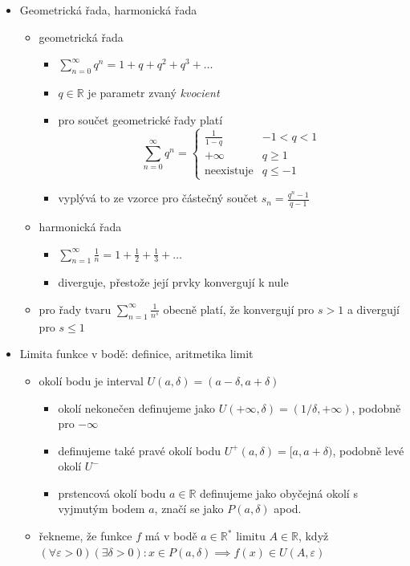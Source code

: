 \begin{itemize}
\begin{itemize}
\item pokud $\lim s_n$ neexistuje nebo je nevlastní, je daná řada \textit{divergentní}
\end{itemize}
\item Geometrická řada, harmonická řada
\begin{itemize}
\item geometrická řada
\begin{itemize}
\item $\sum_{n=0}^\infty q^n=1+q+q^2+q^3+\dots$
\item $q\in\mathbb R$ je parametr zvaný \textit{kvocient}
\item pro součet geometrické řady platí \[\sum_{n=0}^\infty q^n=\begin{cases}\frac1{1-q} &-1\lt q\lt1\\ +\infty &q\geq 1\\\text{neexistuje}&q\leq -1\end{cases}\]
\item vyplývá to ze vzorce pro částečný součet $s_n=\frac{q^n-1}{q-1}$
\end{itemize}
\item harmonická řada
\begin{itemize}
\item $\sum_{n=1}^\infty\frac 1n=1+\frac12+\frac13+\dots$
\item diverguje, přestože její prvky konvergují k nule
\end{itemize}
\item pro řady tvaru $\sum_{n=1}^\infty\frac1{n^s}$ obecně platí, že konvergují pro $s\gt 1$ a divergují pro $s\leq 1$
\end{itemize}
\item Limita funkce v bodě: definice, aritmetika limit
\begin{itemize}
\item okolí bodu je interval $U(a,\delta)=(a-\delta,a+\delta)$
\begin{itemize}
\item okolí nekonečen definujeme jako $U(+\infty,\delta)=(1/\delta,+\infty)$, podobně pro $-\infty$
\item definujeme také pravé okolí bodu $U^+(a,\delta)=[a,a+\delta)$, podobně levé okolí $U^-$
\item prstencová okolí bodu $a\in\mathbb R$ definujeme jako obyčejná okolí s vyjmutým bodem $a$, značí se jako $P(a,\delta)$ apod.
\end{itemize}
\item řekneme, že funkce $f$ má v bodě $a\in\mathbb R^*$ limitu $A\in\mathbb R$, když $(\forall\varepsilon\gt 0)(\exists\delta\gt 0):x\in P(a,\delta)\implies f(x)\in U(A,\varepsilon)$

\end{itemize}
\end{itemize}
